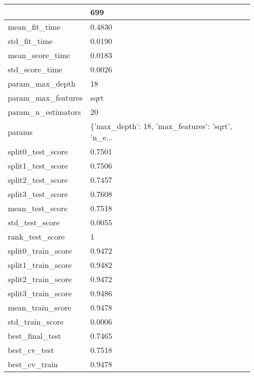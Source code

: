 \begin{tabular}{ll}
\toprule
{} &                                                699 \\
\midrule
mean\_fit\_time      &                                             0.4830 \\
std\_fit\_time       &                                             0.0190 \\
mean\_score\_time    &                                             0.0183 \\
std\_score\_time     &                                             0.0026 \\
param\_max\_depth    &                                                 18 \\
param\_max\_features &                                               sqrt \\
param\_n\_estimators &                                                 20 \\
params             &  \{'max\_depth': 18, 'max\_features': 'sqrt', 'n\_e... \\
split0\_test\_score  &                                             0.7501 \\
split1\_test\_score  &                                             0.7506 \\
split2\_test\_score  &                                             0.7457 \\
split3\_test\_score  &                                             0.7608 \\
mean\_test\_score    &                                             0.7518 \\
std\_test\_score     &                                             0.0055 \\
rank\_test\_score    &                                                  1 \\
split0\_train\_score &                                             0.9472 \\
split1\_train\_score &                                             0.9482 \\
split2\_train\_score &                                             0.9472 \\
split3\_train\_score &                                             0.9486 \\
mean\_train\_score   &                                             0.9478 \\
std\_train\_score    &                                             0.0006 \\
best\_final\_test    &                                             0.7465 \\
best\_cv\_test       &                                             0.7518 \\
best\_cv\_train      &                                             0.9478 \\
\bottomrule
\end{tabular}

